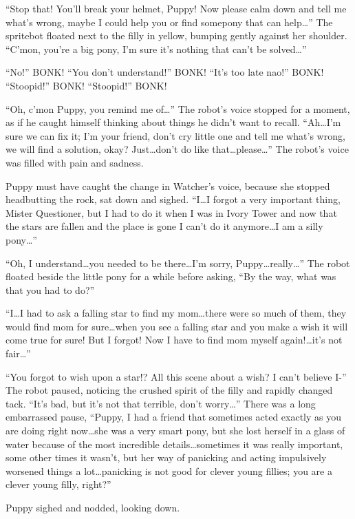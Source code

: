 ``Stop that! You'll break your helmet, Puppy! Now please calm down and tell me what's wrong, maybe I could help you or find somepony that can help\dots'' The spritebot floated next to the filly in yellow, bumping gently against her shoulder. ``C'mon, you're a big pony, I'm sure it's nothing that can't be solved\dots''

``No!'' BONK! ``You don't understand!'' BONK! ``It's too late nao!'' BONK! ``Stoopid!'' BONK! ``Stoopid!'' BONK!

``Oh, c'mon Puppy, you remind me of\dots'' The robot's voice stopped for a moment, as if he caught himself thinking about things he didn't want to recall. ``Ah\dots I'm sure we can fix it; I'm your friend, don't cry little one and tell me what's wrong, we will find a solution, okay? Just\dots don't do like that\dots please\dots'' The robot's voice was filled with pain and sadness.

Puppy must have caught the change in Watcher's voice, because she stopped headbutting the rock, sat down and sighed. ``I\dots I forgot a very important thing, Mister Questioner, but I had to do it when I was in Ivory Tower and now that the stars are fallen and the place is gone I can't do it anymore\dots I am a silly pony\dots''

``Oh, I understand\dots you needed to be there\dots I'm sorry, Puppy\dots really\dots'' The robot floated beside the little pony for a while before asking, ``By the way, what was that you had to do?''

``I\dots I had to ask a falling star to find my mom\dots there were so much of them, they would find mom for sure\dots when you see a falling star and you make a wish it will come true for sure! But I forgot! Now I have to find mom myself again!\dots it's not fair\dots''

``You forgot to wish upon a star!? All this scene about a wish? I can't believe I-'' The robot paused, noticing the crushed spirit of the filly and rapidly changed tack. ``It's bad, but it's not that terrible, don't worry\dots'' There was a long embarrassed pause, ``Puppy, I had a friend that sometimes acted exactly as you are doing right now\dots she was a very smart pony, but she lost herself in a glass of water because of the most incredible details\dots sometimes it was really important, some other times it wasn't, but her way of panicking and acting impulsively worsened things a lot\dots panicking is not good for clever young fillies; you are a clever young filly, right?''

Puppy sighed and nodded, looking down.

